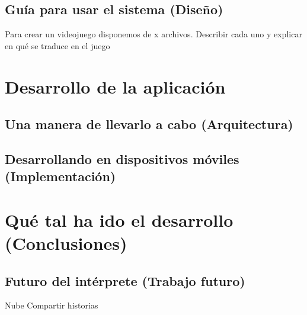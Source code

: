 \section{Guía para usar el sistema (Diseño)}

Para crear un videojuego disponemos de x archivos.
Describir cada uno y explicar en qué se traduce en el juego

\chapter{Desarrollo de la aplicación}

\section{Una manera de llevarlo a cabo (Arquitectura)}

\section{Desarrollando en dispositivos móviles (Implementación)}



\chapter{Qué tal ha ido el desarrollo (Conclusiones)}

\section{Futuro del intérprete (Trabajo futuro)}

Nube
Compartir historias